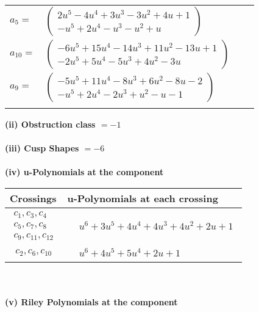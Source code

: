 \documentclass[1p]{elsarticle_modified}
\theoremstyle{definition}
\begin{document}
\begin{tabular}{m{7pt} m{180pt} m{7pt} m{180pt} }
\flushright $a_{5}=$&$\begin{pmatrix}2 u^5-4 u^4+3 u^3-3 u^2+4 u+1\\- u^5+2 u^4- u^3- u^2+u\end{pmatrix}$ \\
\flushright $a_{10}=$&$\begin{pmatrix}-6 u^5+15 u^4-14 u^3+11 u^2-13 u+1\\-2 u^5+5 u^4-5 u^3+4 u^2-3 u\end{pmatrix}$ \\
\flushright $a_{9}=$&$\begin{pmatrix}-5 u^5+11 u^4-8 u^3+6 u^2-8 u-2\\- u^5+2 u^4-2 u^3+u^2- u-1\end{pmatrix}$\\&\end{tabular}
\flushleft \textbf{(ii) Obstruction class $= -1$}\\~\\
\flushleft \textbf{(iii) Cusp Shapes $= -6$}\\~\\
\newpage\renewcommand{\arraystretch}{1}
\flushleft \textbf{(iv) u-Polynomials at the component}\newline \\
\begin{tabular}{m{50pt}|m{274pt}}
Crossings & \hspace{64pt}u-Polynomials at each crossing \\
\hline $$\begin{aligned}c_{1},c_{3},c_{4}\\c_{5},c_{7},c_{8}\\c_{9},c_{11},c_{12}\end{aligned}$$&$\begin{aligned}
&u^6+3 u^5+4 u^4+4 u^3+4 u^2+2 u+1
\end{aligned}$\\
\hline $$\begin{aligned}c_{2},c_{6},c_{10}\end{aligned}$$&$\begin{aligned}
&u^6+4 u^5+5 u^4+2 u+1
\end{aligned}$\\
\hline
\end{tabular}\\~\\
\newpage\renewcommand{\arraystretch}{1}
\flushleft \textbf{(v) Riley Polynomials at the component}\newline \\
\end{document}
